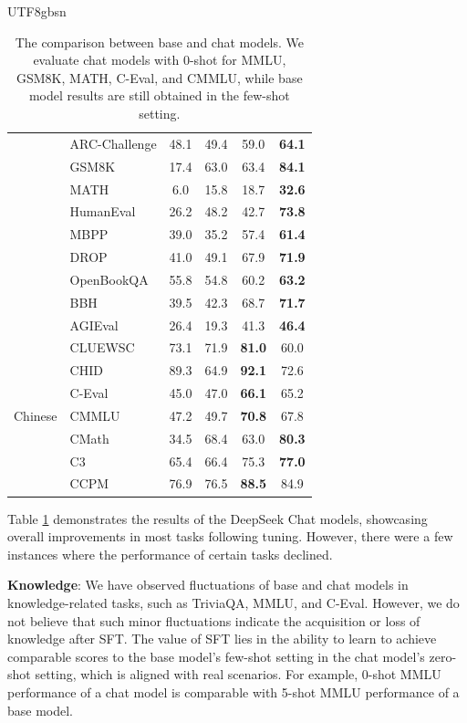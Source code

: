 \documentclass[11pt, a4paper, logo, copyright, nonumbering]{deepseek}
\begin{document}
\begin{CJK*}{UTF8}{gbsn}
\begin{table}[t]
{\begin{tabular}{c|l|c|c|c|c}
&ARC-Challenge & 48.1 & 49.4 & 59.0 & \textbf{64.1} \\
&GSM8K & 17.4 & 63.0 & 63.4 & \textbf{84.1} \\

&MATH & 6.0 & 15.8 &18.7& \textbf{32.6}\\

&HumanEval & 26.2 & 48.2 & 42.7 & \textbf{73.8} \\

&MBPP & 39.0 & 35.2 & 57.4 & \textbf{61.4} \\

&DROP & 41.0 & 49.1 & 67.9 & \textbf{71.9 }\\

&OpenBookQA & 55.8 & 54.8 & 60.2 & \textbf{63.2 }\\

&BBH & 39.5 & 42.3 & 68.7 & \textbf{71.7} \\

&AGIEval & 26.4 & 19.3 & 41.3 & \textbf{46.4} \\
\midrule
\multirow{7}{*}{Chinese}&CLUEWSC & 73.1 & 71.9 & \textbf{81.0} & 60.0 \\

&CHID & 89.3 & 64.9 & \textbf{92.1} & 72.6 \\

&C-Eval & 45.0 & 47.0 & \textbf{66.1} & 65.2 \\

&CMMLU & 47.2 & 49.7 &\textbf{70.8 }& 67.8 \\

&CMath & 34.5 & 68.4 & 63.0 & \textbf{80.3} \\
&C3 &  65.4 & 66.4 & 75.3 & \textbf{77.0} \\

&CCPM &  76.9 & 76.5 & \textbf{88.5} & 84.9 \\
\bottomrule
\end{tabular}}
    \caption{The comparison between base and chat models. We evaluate chat models with 0-shot for MMLU, GSM8K, MATH, C-Eval, and CMMLU, while base model results are still obtained in the few-shot setting.  }
    \label{tab: chat}
\end{table}

Table \ref{tab: chat} demonstrates the results of the DeepSeek Chat models, showcasing overall improvements in most tasks following tuning. However, there were a few instances where the performance of certain tasks declined.

\textbf{Knowledge}: We have observed fluctuations of base and chat models in knowledge-related tasks, such as TriviaQA, MMLU, and C-Eval. However, we do not believe that such minor fluctuations indicate the acquisition or loss of knowledge after SFT. The value of SFT lies in the ability to learn to achieve comparable scores to the base model's few-shot setting in the chat model's zero-shot setting, which is aligned with real scenarios. For example, 0-shot MMLU performance of a chat model is comparable with 5-shot MMLU performance of a base model. 


\end{CJK*}
\end{document}
